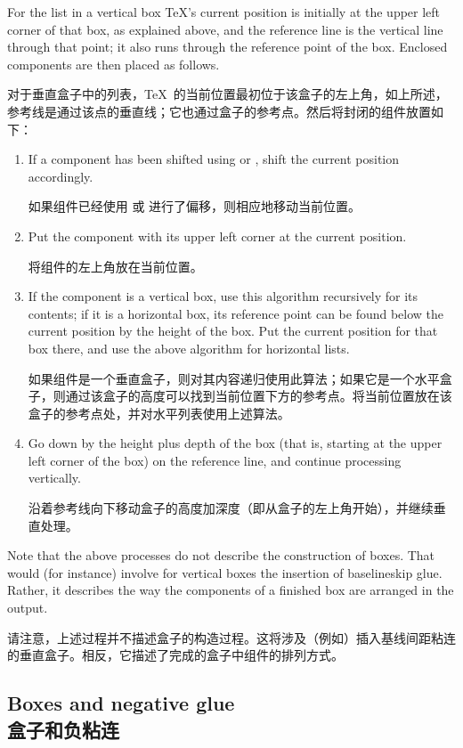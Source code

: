 For the list in a vertical box \TeX's  current position is
initially at the upper left corner of that box, as explained above,
and the reference line is the vertical line through that point;
it also runs through the reference point of the box.
Enclosed components are then placed as follows.

对于垂直盒子中的列表，\TeX\ 的当前位置最初位于该盒子的左上角，如上所述，参考线是通过该点的垂直线；它也通过盒子的参考点。然后将封闭的组件放置如下：
\begin{enumerate} \item If a component has been shifted using
 or , shift the current position
accordingly.

如果组件已经使用  或  进行了偏移，则相应地移动当前位置。
\item Put the component with its upper left corner at the
current position.

将组件的左上角放在当前位置。
\item If the component is a vertical box, use this algorithm
recursively for its contents; if it is a horizontal box,
its reference point can be found below  the current position
by the height of the box. Put the current position for that
box there, and use the above algorithm for horizontal lists.

如果组件是一个垂直盒子，则对其内容递归使用此算法；如果它是一个水平盒子，则通过该盒子的高度可以找到当前位置下方的参考点。将当前位置放在该盒子的参考点处，并对水平列表使用上述算法。
\item Go down by the height plus depth of the box
(that is, starting at the upper left corner of the box)
on the  reference line,
and continue processing vertically.

沿着参考线向下移动盒子的高度加深度（即从盒子的左上角开始），并继续垂直处理。
\end{enumerate}
Note that the above processes do not describe the construction
of boxes. That would (for instance)
involve for vertical boxes the insertion
of baselineskip glue. Rather, it describes the way the components
of a finished box are arranged in the output.

请注意，上述过程并不描述盒子的构造过程。这将涉及（例如）插入基线间距粘连的垂直盒子。相反，它描述了完成的盒子中组件的排列方式。



\subsection{Boxes and negative glue\\盒子和负粘连}


